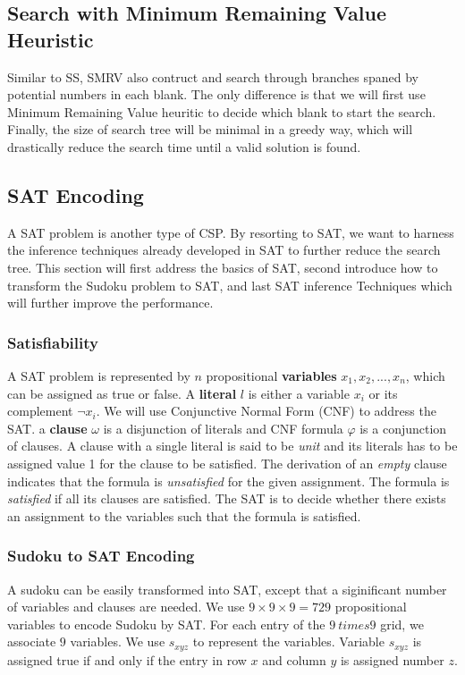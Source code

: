 \documentclass[11pt]{article}
\begin{document}
\subsection {Search with Minimum Remaining Value Heuristic}
Similar to SS, SMRV also contruct and search through branches spaned by potential numbers in each blank. The only difference is that we will first use Minimum Remaining Value heuritic to decide which blank to start the search. Finally, the size of search tree will be minimal in a greedy way, which will drastically reduce the search time until a valid solution is found.

\subsection {SAT Encoding}
A SAT problem is another type of CSP. By resorting to SAT, we want to harness the inference techniques already developed in SAT to further reduce the search tree. This section will first address the basics of SAT, second introduce how to transform the Sudoku problem to SAT, and last SAT inference Techniques which will further improve the performance.

\subsubsection{Satisfiability}
A SAT problem is represented by $n$ propositional \textbf{variables} $x_1, x_2, ... , x_n$, which can be assigned as true or false. A \textbf{literal} $l$ is either a variable $x_i$ or its complement $\neg x_i$. We will use Conjunctive Normal Form (CNF) to address the SAT. a \textbf{clause} $\omega$ is a disjunction of literals and CNF formula $\varphi$ is a conjunction of clauses. A clause with a single literal is said to be \textit{unit} and its literals has to be assigned value 1 for the clause to be satisfied. The derivation of an \textit{empty} clause indicates that the formula is \textit{unsatisfied} for the given assignment. The formula is \textit{satisfied} if all its clauses are satisfied. The SAT is to decide whether there exists an assignment to the variables such that the formula is satisfied. 

\subsubsection{Sudoku to SAT Encoding}
A sudoku can be easily transformed into SAT, except that a siginificant number of variables and clauses are needed. We use $9 \times 9 \times 9 = 729$ propositional variables to encode Sudoku by SAT. For each entry of the $9 \ times 9$ grid, we associate $9$ variables. We use $s_{xyz}$ to represent the variables. Variable $s_{xyz}$ is assigned true if and only if the entry in row $x$ and column $y$ is assigned number $z$.
\end{document}

